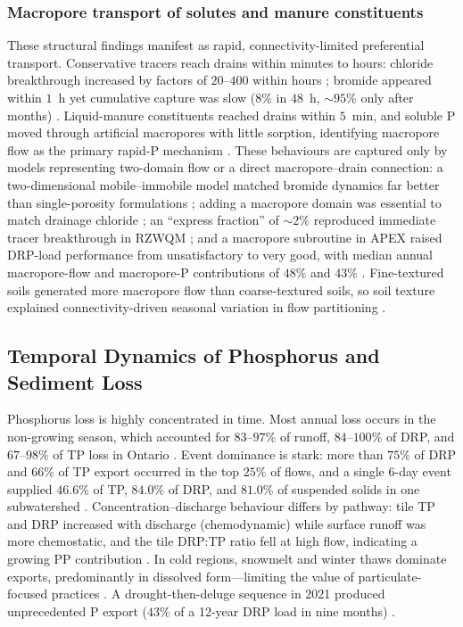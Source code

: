\subsubsection{Macropore transport of solutes and manure constituents}

These structural findings manifest as rapid, connectivity-limited preferential
transport. Conservative tracers reach drains within minutes to hours: chloride
breakthrough increased by factors of $20$--$400$ within hours
\parencite{Villholth1998}; bromide appeared within $1$~h yet cumulative
capture was slow ($8\%$ in $48$~h, $\sim95\%$ only after months)
\parencite{Frey2012,Kladivko2023}. Liquid-manure constituents reached drains
within $5$~min, and soluble P moved through artificial macropores with little
sorption, identifying macropore flow as the primary rapid-P mechanism
\parencite{Stamm2002,Geohring2001}. These behaviours are captured only by
models representing two-domain flow or a direct macropore--drain connection: a
two-dimensional mobile--immobile model matched bromide dynamics far better than
single-porosity formulations \parencite{Köhne2006}; adding a macropore domain
was essential to match drainage chloride \parencite{Villholth1998b}; an
``express fraction'' of $\sim2\%$ reproduced immediate tracer breakthrough in
RZWQM \parencite{Fox2004,Fox2007b}; and a macropore subroutine in APEX raised
DRP-load performance from unsatisfactory to very good, with median annual
macropore-flow and macropore-P contributions of $48\%$ and $43\%$
\parencite{Ford2017}. Fine-textured soils generated more macropore flow than
coarse-textured soils, so soil texture explained connectivity-driven seasonal
variation in flow partitioning \parencite{Poon2021,Holbak2021}.

\subsection{Temporal Dynamics of Phosphorus and Sediment Loss}

Phosphorus loss is highly concentrated in time. Most annual loss occurs in the
non-growing season, which accounted for $83$--$97\%$ of runoff, $84$--$100\%$
of DRP, and $67$--$98\%$ of TP loss in Ontario
\parencite{VanEsbroeck2016,Qi2018}. Event dominance is stark: more than $75\%$
of DRP and $66\%$ of TP export occurred in the top $25\%$ of flows, and a
single 6-day event supplied $46.6\%$ of TP, $84.0\%$ of DRP, and $81.0\%$ of
suspended solids in one subwatershed \parencite{Brendel2019}.
Concentration--discharge behaviour differs by pathway: tile TP and DRP
increased with discharge (chemodynamic) while surface runoff was more
chemostatic, and the tile DRP:TP ratio fell at high flow, indicating a growing
PP contribution \parencite{Osterholz2020}. In cold regions, snowmelt and
winter thaws dominate exports, predominantly in dissolved form---limiting the
value of particulate-focused practices \parencite{Baulch2019,Clement2017}. A
drought-then-deluge sequence in 2021 produced unprecedented P export ($43\%$
of a 12-year DRP load in nine months) \parencite{Millar2025,Mumbi2025b}.

